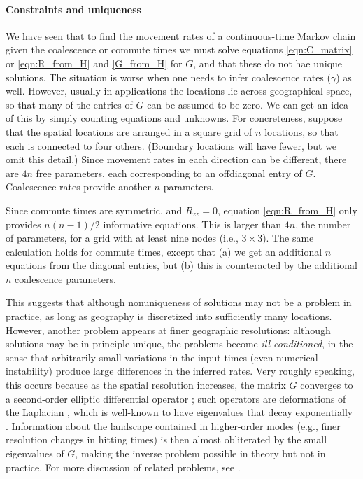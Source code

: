 \documentclass{article}
\begin{document}
\paragraph{Constraints and uniqueness}
We have seen that to find the movement rates of a continuous-time Markov chain
given the coalescence or commute times
we must solve equations \eqref{eqn:C_matrix} or \eqref{eqn:R_from_H} and \eqref{G_from_H} for $G$,
and that these do not hae unique solutions.
The situation is worse when one needs to infer coalescence rates ($\gamma$) as well.
However, usually in applications the locations lie across geographical space,
so that many of the entries of $G$ can be assumed to be zero.
We can get an idea of this by simply counting equations and unknowns.
For concreteness, suppose that the spatial locations
are arranged in a square grid of $n$ locations,
so that each is connected to four others.
(Boundary locations will have fewer, but we omit this detail.)
Since movement rates in each direction can be different,
there are $4n$ free parameters, each corresponding to an offdiagonal entry of $G$.
Coalescence rates provide another $n$ parameters.

Since commute times are symmetric, and $R_{zz} = 0$, 
equation \eqref{eqn:R_from_H} only provides $n (n-1)/2$ informative equations.
This is larger than $4n$, the number of parameters,
for a grid with at least nine nodes (i.e., $3 \times 3$).
The same calculation holds for commute times, 
except that (a) we get an additional $n$ equations from the diagonal entries,
but (b) this is counteracted by the additional $n$ coalescence parameters.

This suggests that although nonuniqueness of solutions may not be a problem in practice,
as long as geography is discretized into sufficiently many locations.
However, another problem appears at finer geographic resolutions:
although solutions may be in principle unique,
the problems become \emph{ill-conditioned}, 
in the sense that arbitrarily small variations in the input times
(even numerical instability)
produce large differences in the inferred rates.
Very roughly speaking, this occurs because as the spatial resolution increases,
the matrix $G$ converges to a second-order elliptic differential operator \citep{pde};
such operators are deformations of the Laplacian \citep{laplacian},
which is well-known to have eigenvalues that decay exponentially \citep{laplacian_eigenvals}.
Information about the landscape contained in higher-order modes
(e.g., finer resolution changes in hitting times)
is then almost obliterated by the small eigenvalues of $G$,
making the inverse problem possible in theory but not in practice.
For more discussion of related problems, see \citet{badtruth,shape_of_a_pop,inverse_prob}.
\end{document}
